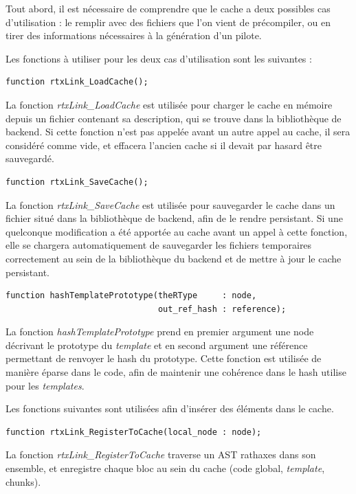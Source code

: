 \documentclass[french]{rtxreport}
\begin{document}
Tout abord, il est nécessaire de comprendre que le cache a deux possibles cas
d'utilisation : le remplir avec des fichiers que l'on vient de précompiler, ou
en tirer des informations nécessaires à la génération d'un pilote.

\vspace{20pt}

Les fonctions à utiliser pour les deux cas d'utilisation sont les suivantes :

\begin{lstlisting}
function rtxLink_LoadCache();
\end{lstlisting}
La fonction \emph{rtxLink\_LoadCache} est utilisée pour charger le cache en
mémoire depuis un fichier contenant sa description, qui se trouve dans la
bibliothèque de backend. Si cette fonction n'est pas appelée avant un autre
appel au cache, il sera considéré comme vide, et effacera l'ancien cache si il
devait par hasard être sauvegardé.

\begin{lstlisting}
function rtxLink_SaveCache();
\end{lstlisting}
La fonction \emph{rtxLink\_SaveCache} est utilisée pour sauvegarder le cache
dans un fichier situé dans la bibliothèque de backend, afin de le rendre
persistant. Si une quelconque modification a été apportée au cache avant un
appel à cette fonction, elle se chargera automatiquement de sauvegarder les
fichiers temporaires correctement au sein de la bibliothèque du backend et de
mettre à jour le cache persistant.

\begin{lstlisting}
function hashTemplatePrototype(theRType     : node,
                               out_ref_hash : reference);
\end{lstlisting}
La fonction \emph{hashTemplatePrototype} prend en premier argument une node
décrivant le prototype du \emph{template} et en second argument une référence
permettant de renvoyer le hash du prototype. Cette fonction est utilisée de
manière éparse dans le code, afin de maintenir une cohérence dans le hash
utilise pour les \emph{templates}.

\vspace{20pt}

Les fonctions suivantes sont utilisées afin d'insérer des éléments dans le
cache.

\begin{lstlisting}
function rtxLink_RegisterToCache(local_node : node);
\end{lstlisting}
La fonction \emph{rtxLink\_RegisterToCache} traverse un AST rathaxes dans son
ensemble, et enregistre chaque bloc au sein du cache (code global,
\emph{template}, chunks).
\end{document}
